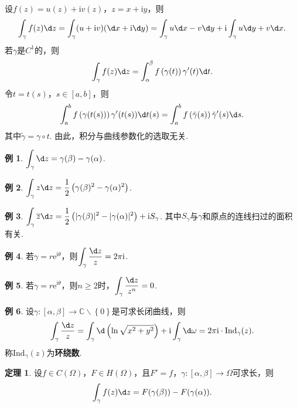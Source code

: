 \documentclass[12pt]{ctexart}
\theoremstyle{definition}
\newtheorem{theorem}{定理}
\newtheorem{example}{例}
\theoremstyle{plain}
\newcommand{\iu}{\mathrm{i}}
\newcommand{\eu}{\mathrm{e}}
\begin{document}
	设$f(z)=u(z)+\iu v(z)$，$z=x+\iu y$，则
	\begin{equation}
		\int_{\gamma}f(z)\d z=\int_{\gamma}(u+\iu v)(\d x+\iu\d y)=\int_{\gamma}u\d x-v\d y+\iu\int_{\gamma}u\d y+v\d x.
	\end{equation}
	若$\gamma$是$C^1$的，则
	\begin{equation}
		\int_{\gamma}f(z)\d z=\int_{\alpha}^{\beta}f\left(\gamma(t)\right)\gamma'(t)\d t.
	\end{equation}
	令$t=t(s)$，$s\in\left[a,b\right]$，则
	\begin{equation}
		\int_{a}^{b}f\left(\gamma(t(s))\right)\gamma'(t(s))\d t(s)=\int_{a}^{b}f\left(\tilde{\gamma}(s)\right)\tilde{\gamma}'(s)\d s.
	\end{equation}
	其中$\tilde{\gamma}=\gamma\circ t$. 由此，积分与曲线参数化的选取无关.
	\begin{example}
		$\displaystyle\int_{\gamma}\d z=\gamma(\beta)-\gamma(\alpha)$.
	\end{example}
	\begin{example}
		$\displaystyle\int_{\gamma}z\d z=\frac{1}{2}\left(\gamma(\beta)^2-\gamma(\alpha)^2\right)$.
	\end{example}
	\begin{example}
		$\displaystyle\int_{\gamma}\overline{z}\d z=\frac{1}{2}\left(|\gamma(\beta)|^2-|\gamma(\alpha)|^2\right)+\iu S_{\gamma}$. 其中$S_{\gamma}$与$\gamma$和原点的连线扫过的面积有关.
	\end{example}
	\begin{example}
		若$\gamma=r\eu^{\iu\theta}$，则$\displaystyle\int_{\gamma}\frac{\d z}{z}=2\pi\iu$.
	\end{example}
	\begin{example}
		若$\gamma=r\eu^{\iu\theta}$，则$n\geqslant 2$时，$\displaystyle\int_{\gamma}\frac{\d z}{z^n}=0$.
	\end{example}
	\begin{example}
		设$\gamma:\left[\alpha,\beta\right]\to\mathbb{C}\backslash\left\{0\right\}$是可求长闭曲线，则
		$$\int_{\gamma}\frac{\d z}{z}=\int_{\gamma}\d\left(\ln\sqrt{x^2+y^2}\right)+\iu\int_{\gamma}\d \omega=2\pi\iu\cdot\mathrm{Ind}_{\gamma}(z).$$
		称$\mathrm{Ind}_{\gamma}(z)$为\textbf{环绕数}.
	\end{example}
	\begin{theorem}
		设$f\in C(\varOmega)$，$F\in H(\varOmega)$，且$F'=f$，$\gamma:\left[\alpha,\beta\right]\to\varOmega$可求长，则
		\begin{equation}
			\int_{\gamma}f(z)\d z=F(\gamma(\beta))-F(\gamma(\alpha)).
		\end{equation}
	\end{theorem}
\end{document}
